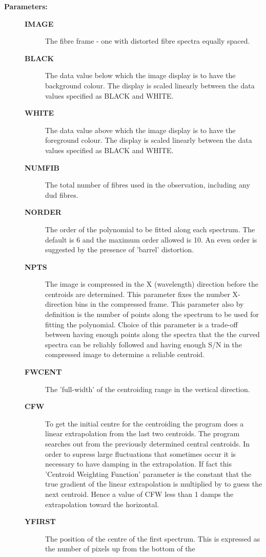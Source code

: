 \begin{description}
\begin{description}
\item [\textbf{Parameters:}]
\begin{description}
\item [\textbf{IMAGE}]
 The fibre frame - one with distorted fibre spectra equally
 spaced.
\item [\textbf{BLACK}]
 The data value below which the image display is to have the
 background colour. The display is scaled linearly between the
 data values specified as BLACK and WHITE.
\item [\textbf{WHITE}]
 The data value above which the image display is to have the
 foreground colour. The display is scaled linearly between the
 data values specified as BLACK and WHITE.
\item [\textbf{NUMFIB}]
 The total number of fibres used in the observation, including
 any dud fibres.
\item [\textbf{NORDER}]
 The order of the polynomial to be fitted along each spectrum.
 The default is 6 and the maximum order allowed is 10. An even
 order is suggested by the presence of 'barrel' distortion.
\item [\textbf{NPTS}]
 The image is compressed in the X (wavelength) direction before
 the centroids are determined. This parameter fixes the number
 X-direction bins in the compressed frame.  This parameter also
 by definition is the number of points along the spectrum to be
 used for fitting the polynomial. Choice of this parameter is a
 trade-off between having enough points along the spectra that
 the the curved spectra can be reliably followed and having
 enough S/N in the compressed image to determine a reliable
 centroid.
\item [\textbf{FWCENT}]
 The 'full-width' of the centroiding range in the vertical
 direction.
\item [\textbf{CFW}]
 To get the initial centre for the centroiding the program does
 a linear extrapolation from the last two centroids. The program
 searches out from the previously determined central centroids.
 In order to supress large fluctuations that sometimes occur it
 is necessary to have damping in the extrapolation.  If fact
 this 'Centroid Weighting Function' parameter is the constant
 that the true gradient of the linear extrapolation is
 multiplied by to guess the next centroid. Hence a value of CFW
 less than 1 damps the extrapolation toward the horizontal.
\item [\textbf{YFIRST}]
 The position of the centre of the first spectrum. This is
 expressed as the number of pixels up from the bottom of the

\end{description}
\end{description}
\end{description}
